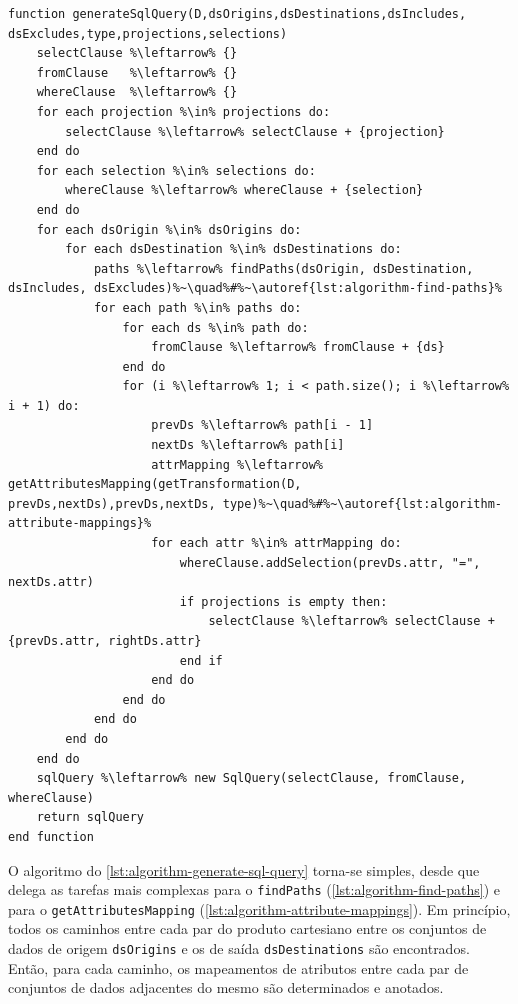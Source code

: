 \begin{minipage}[c]{0.95\textwidth}
\begin{lstlisting}[language=pseudocode,label={lst:algorithm-generate-sql-query},caption={[Geração da consulta em SQL]Geração da consulta na linguagem SQL a partir das especificações do usuário.}]
function generateSqlQuery(D,dsOrigins,dsDestinations,dsIncludes, dsExcludes,type,projections,selections)
    selectClause %\leftarrow% {}
    fromClause   %\leftarrow% {}
    whereClause  %\leftarrow% {}
    for each projection %\in% projections do:
        selectClause %\leftarrow% selectClause + {projection}
    end do
    for each selection %\in% selections do:
        whereClause %\leftarrow% whereClause + {selection}
    end do
    for each dsOrigin %\in% dsOrigins do:
        for each dsDestination %\in% dsDestinations do:
            paths %\leftarrow% findPaths(dsOrigin, dsDestination, dsIncludes, dsExcludes)%~\quad%#%~\autoref{lst:algorithm-find-paths}%
            for each path %\in% paths do:
                for each ds %\in% path do:
                    fromClause %\leftarrow% fromClause + {ds}
                end do                
                for (i %\leftarrow% 1; i < path.size(); i %\leftarrow% i + 1) do:
                    prevDs %\leftarrow% path[i - 1]
                    nextDs %\leftarrow% path[i]
                    attrMapping %\leftarrow% getAttributesMapping(getTransformation(D, prevDs,nextDs),prevDs,nextDs, type)%~\quad%#%~\autoref{lst:algorithm-attribute-mappings}%
                    for each attr %\in% attrMapping do:
                        whereClause.addSelection(prevDs.attr, "=", nextDs.attr)
                        if projections is empty then:
                            selectClause %\leftarrow% selectClause + {prevDs.attr, rightDs.attr}
                        end if
                    end do
                end do
            end do
        end do
    end do
    sqlQuery %\leftarrow% new SqlQuery(selectClause, fromClause, whereClause)
    return sqlQuery
end function
\end{lstlisting}
\end{minipage}

O algoritmo do \autoref{lst:algorithm-generate-sql-query} torna-se simples, desde que delega as tarefas mais complexas para o \texttt{findPaths} (\autoref{lst:algorithm-find-paths}) e para o \texttt{getAttributesMapping} (\autoref{lst:algorithm-attribute-mappings}). Em princípio, todos os caminhos entre cada par do produto cartesiano entre os conjuntos de dados de origem \texttt{dsOrigins} e os de saída \texttt{dsDestinations} são encontrados. Então, para cada caminho, os mapeamentos de atributos entre cada par de conjuntos de dados adjacentes do mesmo são determinados e anotados.

